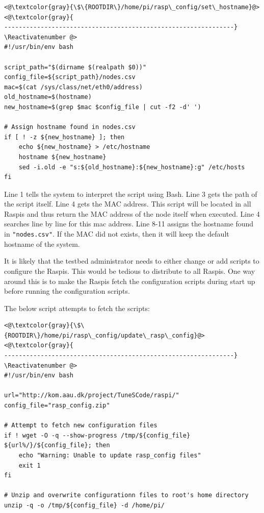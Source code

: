 \Suppressnumber\begin{lstlisting}[]
<@\textcolor{gray}{\$\{ROOTDIR\}/home/pi/rasp\_config/set\_hostname}@>
<@\textcolor{gray}{
---------------------------------------------------------------}
\Reactivatenumber @>
#!/usr/bin/env bash

script_path="$(dirname $(realpath $0))"
config_file=${script_path}/nodes.csv 
mac=$(cat /sys/class/net/eth0/address)
old_hostname=$(hostname)
new_hostname=$(grep $mac $config_file | cut -f2 -d' ')

# Assign hostname found in nodes.csv
if [ ! -z ${new_hostname} ]; then
    echo ${new_hostname} > /etc/hostname
    hostname ${new_hostname}
    sed -i.old -e "s:${old_hostname}:${new_hostname}:g" /etc/hosts
fi
\end{lstlisting}
\FloatBarrier
\vspace{-5mm}

Line 1 tells the system to interpret the script using Bash. Line 3 gets the
path of the script itself. Line 4 gets the MAC address. This script will be
located in all \ac{Raspi}s and thus return the MAC address of the node itself
when executed.
Line 4 searches line by line for this mac address.
Line 8-11 assigns the hostname found in \texttt{"nodes.csv"}. If the MAC did not exists,
then it will keep the default hostname of the system.

It is likely that the testbed administrator needs to either change or add
scripts to configure the \ac{Raspi}s. This would be tedious to distribute to
all \ac{Raspi}s. One way around this is to make the \ac{Raspi}s fetch the
configuration scripts during start up before running the configuration scripts.

The below script attempts to fetch the scripts:

\Suppressnumber\begin{lstlisting}[]
<@\textcolor{gray}{\$\{ROOTDIR\}/home/pi/rasp\_config/update\_rasp\_config}@>
<@\textcolor{gray}{
---------------------------------------------------------------}
\Reactivatenumber @>
#!/usr/bin/env bash

url="http://kom.aau.dk/project/TuneSCode/raspi/"
config_file="rasp_config.zip"

# Attempt to fetch new configuration files
if ! wget -O -q --show-progress /tmp/${config_file} ${url%/}/${config_file}; then
    echo "Warning: Unable to update rasp_config files"
    exit 1
fi

# Unzip and overwrite configurationn files to root's home directory
unzip -q -o /tmp/${config_file} -d /home/pi/
\end{lstlisting}
\FloatBarrier
\vspace{-5mm}


